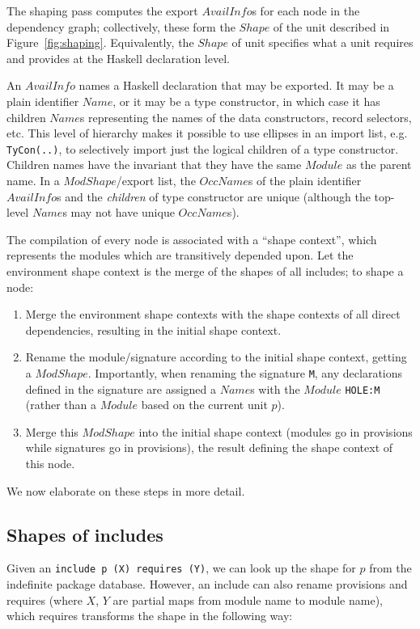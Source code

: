 \documentclass{article}
\newcommand{\I}[1]{\ensuremath{\mathit{#1}}}
\begin{document}
The shaping pass computes the export \I{AvailInfo}s for each node in
the dependency graph; collectively, these form the \I{Shape} of
the unit described in Figure~\ref{fig:shaping}.  Equivalently,
the \I{Shape} of unit specifies what a unit requires and provides
at the Haskell declaration level.

An \I{AvailInfo} names a Haskell declaration that may be exported.
It may be a plain identifier \I{Name}, or it may be a type constructor,
in which case it has children \I{Name}s representing the names of the
data constructors, record selectors, etc.  This level of hierarchy
makes it possible to use ellipses in an import list, e.g. \verb|TyCon(..)|,
to selectively import just the logical children of a type constructor.
Children names have the invariant that they have the same \I{Module} as the parent name.
In a \I{ModShape}/export list,
the \I{OccName}s of the plain identifier \I{AvailInfo}s and the \emph{children}
of type constructor are unique
(although the top-level \I{Name}s may not have unique \I{OccName}s).

The compilation of every node is associated with a ``shape context'',
which represents the modules which are transitively depended upon. Let the
environment shape context is the merge of the shapes of all includes; to
shape a node:

\begin{enumerate}
    \item Merge the environment shape contexts with the shape contexts
    of all direct dependencies, resulting in the initial shape context.
    \item Rename the module/signature according to the initial shape context,
    getting a \I{ModShape}.  Importantly, when renaming the signature \verb|M|,
    any declarations defined in the signature are assigned a \I{Name}s with the \I{Module} \verb|HOLE:M| (rather than a \I{Module} based on the current unit $p$).
    \item Merge this \I{ModShape} into the initial shape context
    (modules go in provisions while signatures go in provisions), the
    result defining the shape context of this node.
\end{enumerate}

We now elaborate on these steps in more detail.

\subsection{Shapes of includes}
Given an \verb|include p (X) requires (Y)|, we can look up the shape
for $p$ from the indefinite package database.  However, an include can
also rename provisions and requires (where $X$, $Y$ are partial maps
from module name to module name), which requires transforms the shape
in the following way:
\end{document}
